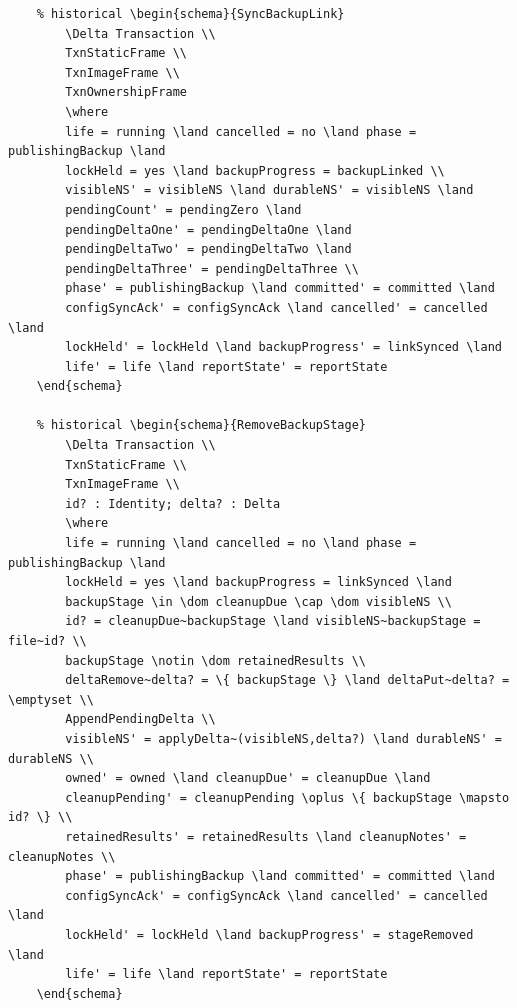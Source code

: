 \documentclass{article}
\begin{document}
\begin{verbatim}
	% historical \begin{schema}{SyncBackupLink}
		\Delta Transaction \\
		TxnStaticFrame \\
		TxnImageFrame \\
		TxnOwnershipFrame
		\where
		life = running \land cancelled = no \land phase = publishingBackup \land
		lockHeld = yes \land backupProgress = backupLinked \\
		visibleNS' = visibleNS \land durableNS' = visibleNS \land
		pendingCount' = pendingZero \land
		pendingDeltaOne' = pendingDeltaOne \land
		pendingDeltaTwo' = pendingDeltaTwo \land
		pendingDeltaThree' = pendingDeltaThree \\
		phase' = publishingBackup \land committed' = committed \land
		configSyncAck' = configSyncAck \land cancelled' = cancelled \land
		lockHeld' = lockHeld \land backupProgress' = linkSynced \land
		life' = life \land reportState' = reportState
	\end{schema}

	% historical \begin{schema}{RemoveBackupStage}
		\Delta Transaction \\
		TxnStaticFrame \\
		TxnImageFrame \\
		id? : Identity; delta? : Delta
		\where
		life = running \land cancelled = no \land phase = publishingBackup \land
		lockHeld = yes \land backupProgress = linkSynced \land
		backupStage \in \dom cleanupDue \cap \dom visibleNS \\
		id? = cleanupDue~backupStage \land visibleNS~backupStage = file~id? \\
		backupStage \notin \dom retainedResults \\
		deltaRemove~delta? = \{ backupStage \} \land deltaPut~delta? = \emptyset \\
		AppendPendingDelta \\
		visibleNS' = applyDelta~(visibleNS,delta?) \land durableNS' = durableNS \\
		owned' = owned \land cleanupDue' = cleanupDue \land
		cleanupPending' = cleanupPending \oplus \{ backupStage \mapsto id? \} \\
		retainedResults' = retainedResults \land cleanupNotes' = cleanupNotes \\
		phase' = publishingBackup \land committed' = committed \land
		configSyncAck' = configSyncAck \land cancelled' = cancelled \land
		lockHeld' = lockHeld \land backupProgress' = stageRemoved \land
		life' = life \land reportState' = reportState
	\end{schema}


\end{verbatim}
\end{document}
